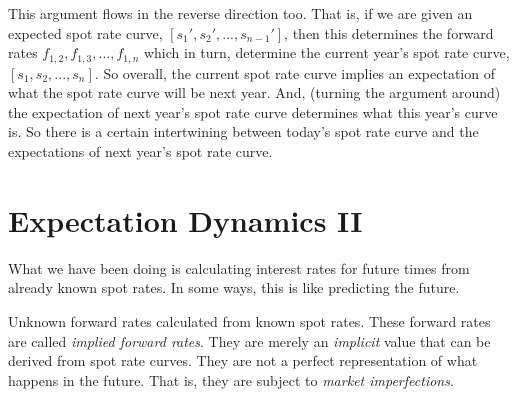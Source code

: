 \begin{figure}[h]
\end{figure}

This argument flows in the reverse direction too. 
That is, if we are given an expected spot rate curve, $[s_1', s_2', ..., s_{n-1}']$, 
then this determines the forward rates $f_{1,2}, f_{1,3}, ..., f_{1,n}$
which in turn, determine the current year's spot rate curve, $[s_1, s_2, ..., s_n]$.
So overall, the current spot rate curve implies an expectation of what the 
spot rate curve will be next year. And, (turning the argument around) the 
expectation of next year's spot rate curve determines what this year's curve is.
So there is a certain intertwining between today's spot rate curve 
and the expectations of next year's spot rate curve. 

\frmrule

\begin{figure}[h]
\end{figure}



\section{Expectation Dynamics II}

What we have been doing is calculating interest rates for future times 
from already known spot rates. In some ways, this is like predicting 
the future. 


\frmrule

Unknown forward rates calculated from known spot rates. 
These forward rates are called \textit{implied forward rates}.
They are merely an \textit{implicit} value that can be derived from spot rate curves. 
They are not a perfect representation of what happens in the future.
That is, they are subject to \textit{market imperfections}. 


